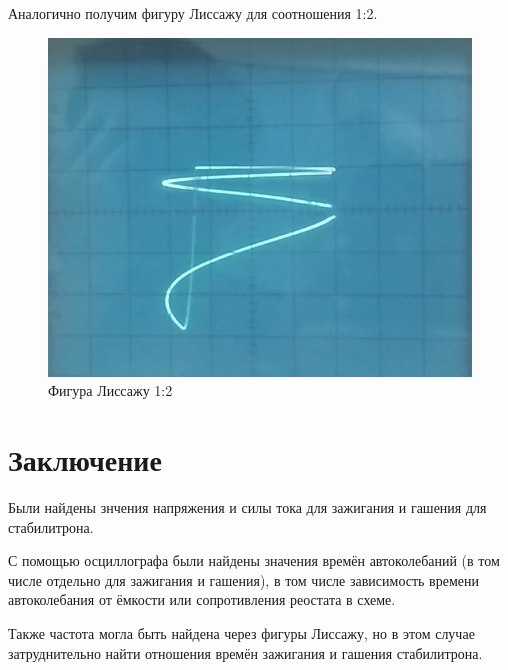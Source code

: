 Аналогично получим фигуру Лиссажу для соотношения 1:2.

\begin{figure}[h!]
    \centering
    \includegraphics[width = 10 cm]{images/liss2.png}
    \caption{Фигура Лиссажу 1:2}
    \label{liss2}
\end{figure}

\section{Заключение}

Были найдены знчения напряжения и силы тока для зажигания и гашения для стабилитрона. 

С помощью осциллографа были найдены значения времён автоколебаний (в том числе отдельно для зажигания и гашения), в том числе зависимость времени автоколебания от ёмкости или сопротивления реостата в схеме.

Также частота могла быть найдена через фигуры Лиссажу, но в этом случае затруднительно найти отношения времён зажигания и гашения стабилитрона.


























